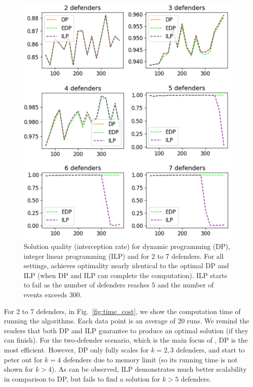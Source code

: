 \begin{figure}[h!]
    \centering
    \includegraphics[width=\linewidth]{chapters/pd/fig/quality-v.png}
    \caption{Solution quality (interception rate) for dynamic programming (DP), integer linear programming (ILP) and \ours  for 2 to 7 defenders. For all settings, \ours achieves optimality nearly identical to the optimal DP and ILP (when DP and ILP can complete the computation). ILP starts to fail as the number of defenders reaches $5$ and the number of events exceeds $300$.}
    \label{fig:quality}
\end{figure}

For 2 to 7 defenders, in Fig.~\ref{fig:time_cost}, we show the computation time of running the algorithms. 
Each data point is an average of 20 runs. 
We remind the readers that both DP and ILP guarantee to produce an optimal solution (if they can finish).
For the two-defender scenario, which is the main focus of \cite{adler2022role}, DP is the most efficient.
However, DP only fully scales for $k=2, 3$ defenders, and start to peter out for $k=4$ defenders due to memory limit (so its running time is not shown for $k>4$).
As can be observed, ILP demonstrates much better scalability in comparison to DP, but fails to find a solution for $k > 5$ defenders. 

